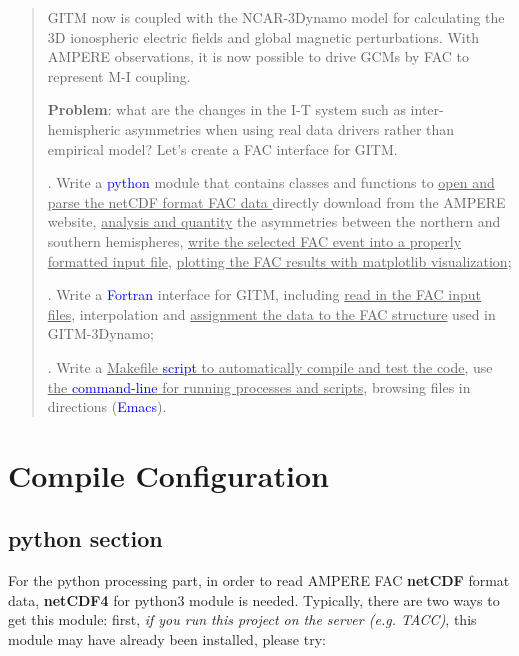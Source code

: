 \documentclass[12pt, letterpaper]{article} %
\begin{document}
\begin{quote}  %
\noindent GITM now is coupled with the NCAR-3Dynamo model for calculating the 3D ionospheric electric fields and global magnetic perturbations. With AMPERE observations, it is now possible to drive GCMs by FAC to represent M-I coupling. 

\noindent \textbf{Problem}: what are the changes in the I-T system such as inter-hemispheric asymmetries when using real data drivers rather than empirical model? Let’s create a FAC interface for GITM. 

.	Write a \textcolor{blue}{python} module that contains classes and functions to  \uline{open and parse the netCDF format FAC data } directly download from the AMPERE website,  \uline{analysis and quantity} the asymmetries between the northern and southern hemispheres,  \uline{write the selected FAC event into a properly formatted input file},  \uline{plotting the FAC results with matplotlib visualization};

.	Write a \textcolor{blue}{Fortran} interface for GITM, including  \uline{read in the FAC input files}, interpolation and  \uline{assignment the data to the FAC structure} used in GITM-3Dynamo;

.	Write a  \uline{Makefile \textcolor{blue}{script} to automatically compile and test the code}, use  \uline{the \textcolor{blue}{command-line} for running processes and scripts}, browsing files in directions (\textcolor{blue}{Emacs}). 
\end{quote} %




\section{Compile Configuration} %
\subsection{python section}

\noindent For the python processing part, in order to read AMPERE FAC  \textbf{netCDF} format data,  \textbf{netCDF4} for python3 module is needed. Typically, there are two ways to get this module: first, \emph{if you run this project on the server (e.g. TACC)}, this module may have already been installed, please try:
\end{document}
